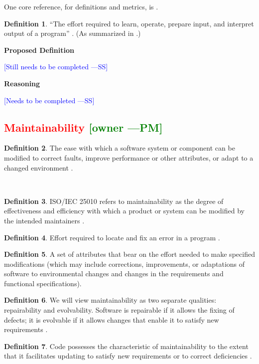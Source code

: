 \documentclass[letterpaper,cleveref]{lipics-v2019}
\newcommand{\authornote}[3]{\textcolor{#1}{[#3 ---#2]}}
\newcommand{\authornote}[3]{}
\newcommand{\wss}[1]{\authornote{blue}{SS}{#1}} %
\newcommand{\pmi}[1]{\authornote{green}{PM}{#1}} %
\newcommand{\notdone}[1]{\textcolor{red}{#1}}
\theoremstyle{definition}
\newtheorem{defn}{Definition}
\begin{document}
One core reference, for definitions and metrics, is
\citet{bevan1995measuring}.

\begin{defn}
  ``The effort required to learn, operate, prepare input, and interpret output
  of a program'' \citep{McCallEtAl1977}. (As summarized in
  \citet{VanVliet2000}.)
\end{defn}

\noindent \textbf{Proposed Definition}

\wss{Still needs to be completed}

\noindent \textbf{Reasoning}

\wss{Needs to be completed}

\subsection{\notdone{Maintainability} \pmi{owner}}

\begin{defn} \label{MaintainabilityDefnSelected1}
The ease with which a software system or component can be modified to correct
faults, improve performance or other attributes, or adapt to a changed
environment \citep{IEEEStdGlossarySET1990}. 
\end{defn}\
\begin{defn}
ISO/IEC 25010 refers to maintainability as the degree of effectiveness and
efficiency with which a product or system can be modified by the intended
maintainers \citep{ISO/IEC25010}.
\end{defn}
\begin{defn}
Effort required to locate and fix an error in a program
\citep{pressman2005software}.
\end{defn}
\begin{defn}
A set of attributes that bear on the effort needed to make specified
modifications (which may include corrections, improvements, or adaptations of
software to environmental changes and changes in the requirements and functional
specifications)\citep{pfleeger2006software}.
\end{defn}
\begin{defn}
We will view maintainability as two separate qualities: repairability and
evolvability. Software is repairable if it allows the fixing of defects; it is
evolvable if it allows changes that enable it to satisfy new requirements
\citep{ghezzi1991fundamentals}.
\end{defn}
\begin{defn} \label{MaintainabilityDefnSelected2}
Code possesses the characteristic of maintainability to the extent that it
facilitates updating to satisfy new requirements or to correct deficiencies
\citep{boehm2007software}.
\end{defn}
\end{document}
